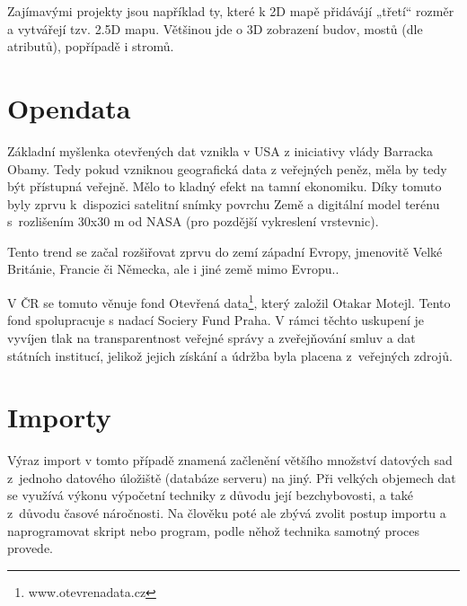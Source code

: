 Zajímavými projekty jsou například ty, které k 2D mapě přidávájí „třetí“ rozměr a
vytvářejí tzv. 2.5D mapu. Většinou jde o 3D zobrazení budov, mostů (dle
atributů), popřípadě i stromů.

\section{Opendata}
\label{opendata}

Základní myšlenka otevřených dat vznikla v USA z iniciativy vlády Barracka Obamy.
Tedy pokud vzniknou geografická data z veřejných peněz, měla by tedy být
přístupná veřejně. Mělo to kladný efekt na tamní ekonomiku. Díky tomuto byly
zprvu k~dispozici satelitní snímky povrchu Země a digitální model terénu
s~rozlišením 30x30 m od NASA (pro pozdější vykreslení vrstevnic).

Tento trend se začal rozšiřovat zprvu do zemí západní Evropy,
jmenovitě Velké Británie, Francie či Německa, ale i jiné země mimo Evropu..

V ČR se tomuto věnuje fond Otevřená data\footnote{www.otevrenadata.cz}, který založil Otakar
Motejl. Tento fond spolupracuje s nadací Sociery Fund Praha. V rámci
těchto uskupení je vyvíjen tlak na transparentnost veřejné správy a
zveřejňování smluv a dat
státních institucí, jelikož jejich získání a údržba byla placena
z~veřejných zdrojů.



\section{Importy}
\label{Importy}
Výraz import v tomto případě znamená začlenění většího množství datových sad
z~jednoho datového úložiště (databáze serveru) na jiný. Při velkých objemech dat
se využívá výkonu výpočetní techniky z důvodu její bezchybovosti, a také
z~důvodu časové náročnosti. Na člověku poté ale zbývá zvolit postup importu
a naprogramovat skript nebo program, podle něhož technika samotný proces
provede. 

